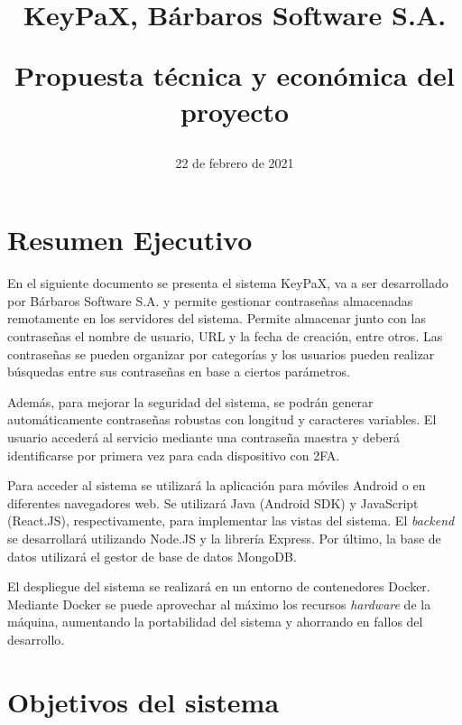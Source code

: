 \documentclass{article}
\title{
\Huge{KeyPaX, Bárbaros Software S.A.} \\ 
\begin{Large} 
Propuesta técnica y económica del proyecto
\end{Large}}
\author{}
\date{22 de febrero de 2021}
\begin{document}
\maketitle

\pagebreak

\section{Resumen Ejecutivo}

En el siguiente documento se presenta el sistema KeyPaX, va a ser desarrollado por Bárbaros Software S.A. y permite gestionar contraseñas almacenadas remotamente en los servidores del sistema. Permite almacenar junto con las contraseñas el nombre de usuario, URL y la fecha de creación, entre otros. Las contraseñas se pueden organizar por categorías y los usuarios pueden realizar búsquedas entre sus contraseñas en base a ciertos parámetros.

Además, para mejorar la seguridad del sistema, se podrán generar automáticamente contraseñas robustas con longitud y caracteres variables. El usuario accederá al servicio mediante una contraseña maestra y deberá identificarse por primera vez para cada dispositivo con 2FA.

Para acceder al sistema se utilizará la aplicación para móviles Android o en diferentes navegadores web. Se utilizará Java (Android SDK) y JavaScript (React.JS), respectivamente, para implementar las vistas del sistema. El \textit{backend} se desarrollará utilizando Node.JS y la librería Express. Por último, la base de datos utilizará el gestor de base de datos MongoDB. 

El despliegue del sistema se realizará en un entorno de contenedores Docker. Mediante Docker se puede aprovechar al máximo los recursos \textit{hardware} de la máquina, aumentando la portabilidad del sistema y ahorrando en fallos del desarrollo. 




\pagebreak

\tableofcontents

\pagebreak

\section{Objetivos del sistema}

\end{document}
